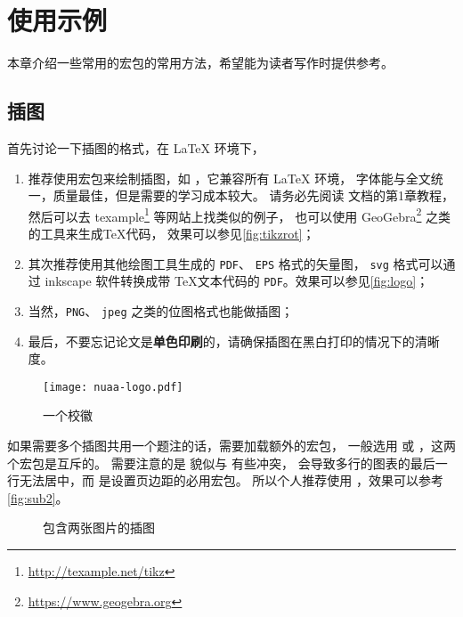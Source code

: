 \chapter{使用示例}

本章介绍一些常用的宏包的常用方法，希望能为读者写作时提供参考。

\section{插图}

首先讨论一下插图的格式，在 \LaTeX{} 环境下，
\begin{enumerate}
\item 推荐使用宏包来绘制插图，如 ，它兼容所有 \LaTeX{} 环境，
字体能与全文统一，质量最佳，但是需要的学习成本较大。
请务必先阅读  文档的第1章教程，
然后可以去 texample\footnote{\url{http://texample.net/tikz}} 等网站上找类似的例子，
也可以使用 GeoGebra\footnote{\url{https://www.geogebra.org}} 之类的工具来生成\TeX 代码，
效果可以参见\autoref{fig:tikzrot}；
\item 其次推荐使用其他绘图工具生成的 \verb|PDF|、 \verb|EPS| 格式的矢量图，
\verb|svg| 格式可以通过 inkscape 软件转换成带 \TeX{}文本代码的 \verb|PDF|。效果可以参见\autoref{fig:logo}；
\item 当然，\verb|PNG|、 \verb|jpeg| 之类的位图格式也能做插图；
\item 最后，不要忘记论文是\textbf{单色印刷}的，请确保插图在黑白打印的情况下的清晰度。
\end{enumerate}

\begin{figure}[!htb]
    \centering
    \texttt{[image: nuaa-logo.pdf]}
    \caption{一个校徽}
    \label{fig:logo}
\end{figure}

如果需要多个插图共用一个题注的话，需要加载额外的宏包，
一般选用  或 ，这两个宏包是互斥的。
需要注意的是  貌似与  有些冲突，
会导致多行的图表的最后一行无法居中，而  是设置页边距的必用宏包。
所以个人推荐使用  ，效果可以参考\autoref{fig:sub2}。

\begin{figure}[!htb]
  \quad
  \caption{包含两张图片的插图}
  \label{fig:subfigs}
\end{figure}


